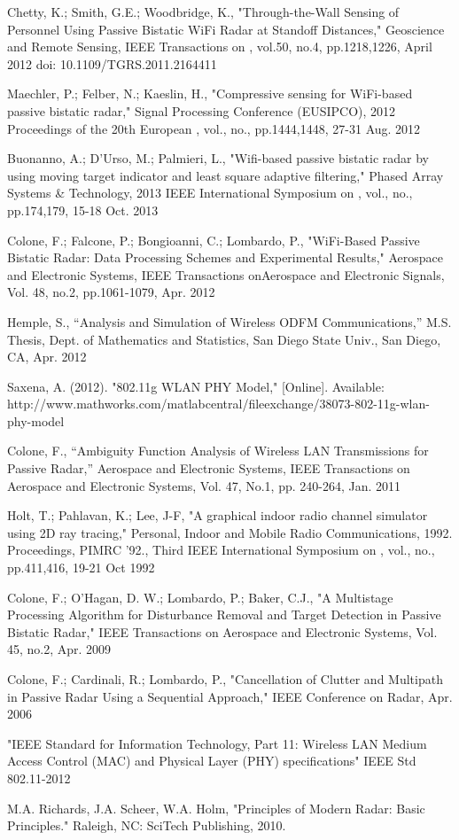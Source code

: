 \documentclass[article,11pt,onecolumn,final]{IEEEtran}
\begin{document}
\begin{thebibliography}{100}

 Chetty, K.; Smith, G.E.; Woodbridge, K., "Through-the-Wall Sensing of Personnel Using Passive
Bistatic WiFi Radar at Standoff Distances," Geoscience and Remote Sensing, IEEE Transactions on ,
vol.50, no.4, pp.1218,1226, April 2012
doi: 10.1109/TGRS.2011.2164411

 Maechler, P.; Felber, N.; Kaeslin, H., "Compressive sensing for WiFi-based passive bistatic radar,"
Signal Processing Conference (EUSIPCO), 2012 Proceedings of the 20th European , vol., no.,
pp.1444,1448, 27-31 Aug. 2012

 Buonanno, A.; D'Urso, M.; Palmieri, L., "Wifi-based passive bistatic radar by using moving target
indicator and least square adaptive filtering," Phased Array Systems \& Technology, 2013 IEEE
International Symposium on , vol., no., pp.174,179, 15-18 Oct. 2013

 Colone, F.; Falcone, P.; Bongioanni, C.; Lombardo, P., "WiFi-Based Passive Bistatic Radar: Data
Processing Schemes and Experimental Results," Aerospace and Electronic Systems, IEEE Transactions
onAerospace and Electronic Signals, Vol. 48, no.2, pp.1061-1079, Apr. 2012

 Hemple, S., “Analysis and Simulation of Wireless ODFM Communications,” M.S. Thesis, Dept. of
Mathematics and Statistics, San Diego State Univ., San Diego, CA, Apr. 2012

 Saxena, A. (2012). "802.11g WLAN PHY Model," [Online]. Available: http://www.mathworks.com/matlabcentral/fileexchange/38073-802-11g-wlan-phy-model

 Colone, F., “Ambiguity Function Analysis of Wireless LAN Transmissions for Passive Radar,”
Aerospace and Electronic Systems, IEEE Transactions on Aerospace and Electronic Systems, Vol. 47, No.1,
pp. 240-264, Jan. 2011

 Holt, T.; Pahlavan, K.; Lee, J-F, "A graphical indoor radio channel simulator using 2D ray tracing," Personal, Indoor and Mobile Radio Communications, 1992. Proceedings, PIMRC '92., Third IEEE International Symposium on , vol., no., pp.411,416, 19-21 Oct 1992

 Colone, F.; O'Hagan, D. W.; Lombardo, P.; Baker, C.J., "A Multistage Processing Algorithm for Disturbance Removal and Target Detection in Passive Bistatic Radar," IEEE Transactions on Aerospace and Electronic Systems, Vol. 45, no.2, Apr. 2009

 Colone, F.; Cardinali, R.; Lombardo, P., "Cancellation of Clutter and Multipath in Passive Radar Using a Sequential Approach," IEEE Conference on Radar, Apr. 2006

\bibitem "IEEE Standard for Information Technology, Part 11: Wireless LAN Medium Access Control (MAC) and Physical Layer (PHY) specifications" IEEE Std 802.11-2012

 M.A. Richards, J.A. Scheer, W.A. Holm, "Principles of Modern Radar: Basic Principles." Raleigh, NC: SciTech Publishing, 2010.


\end{thebibliography}
\end{document}
